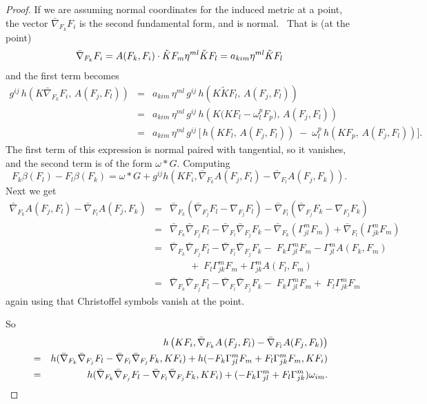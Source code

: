 \documentclass[12pt,letterpaper]{amsart}%
\numberwithin{mycounter}{section}
\theoremstyle{plain}
\numberwithin{equation}{section}
\theoremstyle{definition}
\begin{document}
\begin{proof}
If we are assuming normal coordinates for the induced metric at a point, the vector 
$\bar{\nabla}_{F_{k}}F_{i}$ is the second fundamental form, and is normal.
\ That is (at the point)\  
\[
\bar{\nabla}_{F_{k}}F_{i}=A(F_{k},F_{i})\cdot \tilde{K}F_{m}\eta ^{ml}\tilde{%
K}F_{l}=a_{kim}\eta ^{ml}\tilde{K}F_{l}
\]%
and the first term becomes \begin{eqnarray*}
g^{ij}\, h\!\left( K \bar{\nabla}_{F_{k}} F_{i},\, A(F_{j}, F_{l}) \right)
&=&
a_{kim}\, \eta^{ml}\, g^{ij}\,
h\!\left( K \tilde{K} F_{l},\, A(F_{j}, F_{l}) \right)
\\[6pt]
&=&
a_{kim}\, \eta^{ml}\, g^{ij}\,
h\!\left( K\big(KF_{l} - \omega_{l}^{p} F_{p}\big),\, A(F_{j},F_{l}) \right)
\\[6pt]
&=&
a_{kim}\, \eta^{ml}\, g^{ij}\,
\Big[
\, h\!\left( KF_{l},\, A(F_{j}, F_{l}) \right)
\;-\;
\omega_{l}^{p}\, h\!\left( K F_{p},\, A(F_{j}, F_{l}) \right)
\Big].
\end{eqnarray*}
The first term of this expression is normal paired with tangential, so it
vanishes, and the second term is of the form $\omega \ast G.$
Computing
\[
F_{k}\beta (F_{l})-F_{l}\beta (F_{k})=\omega \ast G+g^{ij}h\left( KF_{i},%
\bar{\nabla}_{F_{k}}A\left( F_{j},F_{l}\right) -\bar{\nabla}%
_{F_{l}}A(F_{j},F_{k})\right) .
\]%
Next we get
\begin{eqnarray*}
\bar{\nabla}_{F_{k}}A\left( F_{j},F_{l}\right) -\bar{\nabla}_{F_{l}}A(F_{j},F_{k})
&=&
\bar{\nabla}_{F_{k}}\left( \bar{\nabla}_{F_{j}}F_{l}-\nabla _{F_{j}}F_{l}\right)
-\bar{\nabla}_{F_{l}}\left( \bar{\nabla}_{F_{j}}F_{k}-\nabla _{F_{j}}F_{k}\right)
\\
&=&
\bar{\nabla}_{F_{k}}\bar{\nabla}_{F_{j}}F_{l}
-\bar{\nabla}_{F_{l}}\bar{\nabla}_{F_{j}}F_{k}
-\bar{\nabla}_{F_{k}}\left( \Gamma _{jl}^{m}F_{m}\right)
+\bar{\nabla}_{F_{l}}\left( \Gamma _{jk}^{m}F_{m}\right)
\\
&=&
\bar{\nabla}_{F_{k}}\bar{\nabla}_{F_{j}}F_{l}
-\bar{\nabla}_{F_{l}}\bar{\nabla}_{F_{j}}F_{k}
-\;F_{k}\Gamma _{jl}^{m}F_{m}
-\Gamma _{jl}^{m}A(F_{k},F_{m})
\\
&&\qquad
+\;F_{l}\Gamma _{jk}^{m}F_{m}
+\Gamma _{jk}^{m}A(F_{l},F_{m})
\\
&=&
\bar{\nabla}_{F_{k}}\bar{\nabla}_{F_{j}}F_{l}
-\bar{\nabla}_{F_{l}}\bar{\nabla}_{F_{j}}F_{k}
-\;F_{k}\Gamma _{jl}^{m}F_{m}
+\;F_{l}\Gamma _{jk}^{m}F_{m}
\end{eqnarray*}
again using that Christoffel symbols vanish at the point. \ 

So 
\begin{eqnarray*}
&&h\left( KF_{i},\bar{\nabla}_{F_{k}}A\left( F_{j},F_{l}\right) -\bar{\nabla}%
_{F_{l}}A(F_{j},F_{k})\right)  \\
&=&h(\bar{\nabla}_{F_{k}}\bar{\nabla}_{F_{j}}F_{l}-\bar{\nabla}_{F_{l}}\bar{%
\nabla}_{F_{j}}F_{k},KF_{i})+h(-F_{k}\Gamma _{jl}^{m}F_{m}+F_{l}\Gamma
_{jk}^{m}F_{m},KF_{i}) \\
&=&h(\bar{\nabla}_{F_{k}}\bar{\nabla}_{F_{j}}F_{l}-\bar{\nabla}_{F_{l}}\bar{%
\nabla}_{F_{j}}F_{k},KF_{i})+(-F_{k}\Gamma _{jl}^{m}+F_{l}\Gamma
_{jk}^{m})\omega _{im}.
\end{eqnarray*}


\end{proof}
\end{document}
